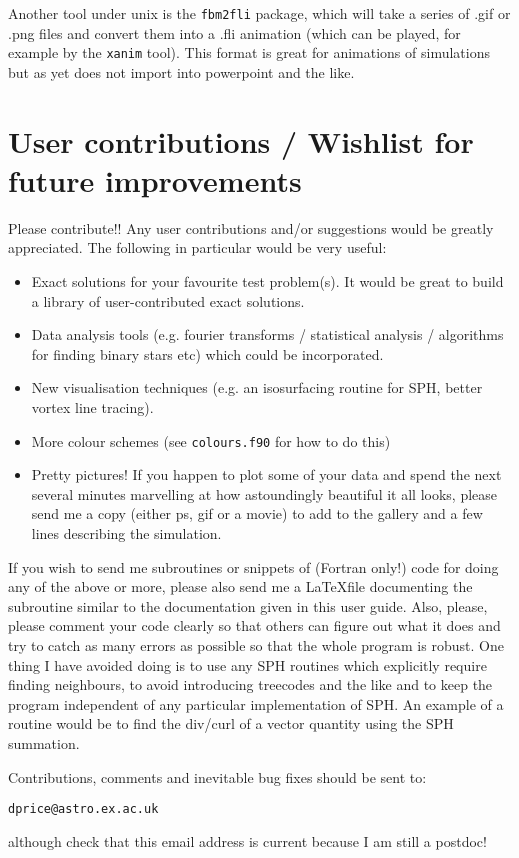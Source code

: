 \documentclass[a4paper,11pt]{article}
\begin{document}
 Another tool under unix is the \verb+fbm2fli+ package, which will take a series of .gif or .png files and
convert them into a .fli animation (which can be played, for example by the \verb+xanim+ tool). This
format is great for animations of simulations but as yet does not import into powerpoint and the like.

\section{User contributions / Wishlist for future improvements}
 Please contribute!! Any user contributions and/or suggestions would be greatly
appreciated. The following in particular would be very useful:

\begin{itemize}
\item Exact solutions for your favourite test problem(s). It would be great to
build a library of user-contributed exact solutions.
\item Data analysis tools (e.g. fourier transforms / statistical analysis /
algorithms for finding binary stars etc) which could be incorporated.
\item New visualisation techniques (e.g. an isosurfacing routine for SPH, better
vortex line tracing).
\item More colour schemes (see \verb+colours.f90+ for how to do this)
\item Pretty pictures! If you happen to plot some of your data and spend the
next several minutes marvelling at how astoundingly beautiful it all looks, please send
me a copy (either ps, gif or a movie) to add to the gallery and a few lines
describing the simulation.
\end{itemize}


If you wish to send me subroutines or snippets of (Fortran only!) code for doing any of the above or
more, please also send me a \LaTeX file
documenting the subroutine similar to the documentation given in this user guide.
Also, please, please comment your code clearly so that others can figure out
what it does and try to catch as many errors as possible so that the whole
program is robust.  One thing I have avoided doing is to use any SPH
routines which explicitly require finding neighbours, to avoid introducing treecodes and
the like and to keep the program independent of any particular implementation of
SPH. An example of a
routine would be to find the div/curl of a vector quantity using
the SPH summation.

Contributions, comments and inevitable bug fixes
should be sent to:
\begin{verbatim}
dprice@astro.ex.ac.uk
\end{verbatim}
although check that this email address is current because I am still a postdoc!
\end{document}
